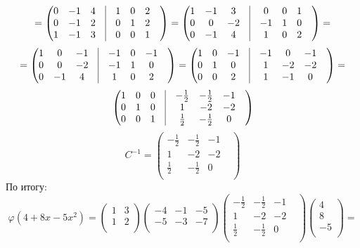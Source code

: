 \documentclass[a4paper,12pt]{article}
\begin{document}
\[
=
\begin{pmatrix}
0 & -1 & 4 & \vrule &1 & 0 & 2 & \\
0 & -1 & 2 & \vrule &0 & 1 & 2 & \\
1 & -1 & 3 & \vrule &0 & 0 & 1 & \\
\end{pmatrix}
=
\begin{pmatrix}
1 & -1 & 3 & \vrule &0 & 0 & 1 & \\
0 & 0 & -2 & \vrule &-1 & 1 & 0 & \\
0 & -1 & 4 & \vrule &1 & 0 & 2 & \\
\end{pmatrix}
=
\]
\[
=
\begin{pmatrix}
1 & 0 & -1 & \vrule &-1 & 0 & -1 & \\
0 & 0 & -2 & \vrule &-1 & 1 & 0 & \\
0 & -1 & 4 & \vrule &1 & 0 & 2 & \\
\end{pmatrix}
=
\begin{pmatrix}
1 & 0 & -1 & \vrule &-1 & 0 & -1 & \\
0 & 1 & 0 & \vrule &1 & -2 & -2 & \\
0 & 0 & 2 & \vrule &1 & -1 & 0 & \\
\end{pmatrix}
=
\]
\[
\begin{pmatrix}
1 & 0 & 0& \vrule &-\frac{1}{2} & -\frac{1}{2} & -1 & \\
0 & 1 & 0 & \vrule &1 & -2 & -2 & \\
0 & 0 & 1 & \vrule &\frac{1}{2} & -\frac{1}{2}& 0 & \\
\end{pmatrix}
\]
\[
C^{-1} = 
\begin{pmatrix}
-\frac{1}{2} & -\frac{1}{2} & -1 & \\
1 & -2 & -2 & \\
\frac{1}{2} & -\frac{1}{2}& 0 & \\
\end{pmatrix}
\]
По итогу:
\[
\varphi(4+8x-5x^2) = \begin{pmatrix}
1 & 3 \\
1 & 2\\
\end{pmatrix}
\begin{pmatrix}
-4 & -1 & -5\\
-5 & -3 & -7\\
\end{pmatrix}
\begin{pmatrix}
-\frac{1}{2} & -\frac{1}{2} & -1 & \\
1 & -2 & -2 & \\
\frac{1}{2} & -\frac{1}{2}& 0 & \\
\end{pmatrix}
\begin{pmatrix}
4 \\
8 \\
-5\\
\end{pmatrix}
=
\]
\end{document}
